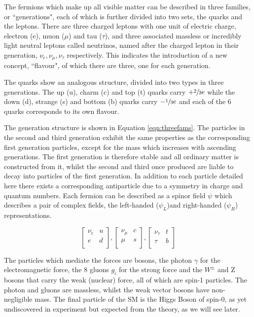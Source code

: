 The fermions which make up all visible matter can be described in three families, or ``generations", each of which is further divided into two sets, the quarks and the leptons. There are three charged leptons with one unit of electric charge, electron (e), muon ($\mu$) and tau ($\tau$), and three associated massless or incredibly light  neutral leptons called neutrinos, named after the charged lepton in their generation, $\nu_{e}, \nu_{\mu},\nu_{\tau}$ respectively. This indicates the introduction of a new concept, ``flavour", of which there are three, one for each generation. 

The quarks show an analogous structure, divided into two types in three generations. The up (u), charm (c) and top (t) quarks carry $+\sfrac{2}{3}e$ while the down (d), strange (s) and bottom (b) quarks carry $-\sfrac{1}{3}e$ and each of the 6 quarks corresponds to its own flavour. 

The generation structure is shown in Equation \ref{eqn:threefams}. The particles in the second and third generation exhibit the same properties as the corresponding first generation particles, except for the mass which increases with ascending generations. The first generation is therefore stable and all ordinary matter is constructed from it, whilst the second and third once produced are liable to decay into particles of the first generation. In addition to each particle detailed here there exists a corresponding antiparticle due to a symmetry in charge and quantum numbers.  Each fermion can be described as a spinor field $\psi$ which describes a pair of complex fields, the left-handed ($\psi_{L}$)and right-handed ($\psi_{R}$) representations. 
 
\begin{equation}
\begin{bmatrix}
\nu_{e} & u \\
e & d \\
\end{bmatrix},
\begin{bmatrix}
\nu_{\mu} & c \\
\mu & s \\
\end{bmatrix},
\begin{bmatrix}
\nu_{\tau} & t \\
\tau & b\\
\end{bmatrix}
\label{eqn:threefams}
\end{equation}

The particles which mediate the forces are bosons, the photon $\gamma$ for the electromagnetic force, the 8 gluons $g_{i}$ for the strong force and the $W^{\pm}$ and Z bosons that carry the weak (nuclear) force, all of which are spin-1 particles. The photon and gluons are massless, whilst the weak vector bosons have non-negligible mass. The final particle of the SM is the Higgs Boson of spin-0, as yet undiscovered in experiment but expected from the theory, as we will see later. 

